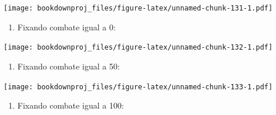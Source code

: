 \documentclass[
]{article}
\newenvironment{Shaded}{\begin{snugshade}}{\end{snugshade}}
\newcommand{\DataTypeTok}[1]{\textcolor[rgb]{0.13,0.29,0.53}{#1}}
\newcommand{\DecValTok}[1]{\textcolor[rgb]{0.00,0.00,0.81}{#1}}
\newcommand{\KeywordTok}[1]{\textcolor[rgb]{0.13,0.29,0.53}{\textbf{#1}}}
\newcommand{\NormalTok}[1]{#1}
\newcommand{\OperatorTok}[1]{\textcolor[rgb]{0.81,0.36,0.00}{\textbf{#1}}}
\newcommand{\StringTok}[1]{\textcolor[rgb]{0.31,0.60,0.02}{#1}}
\providecommand{\tightlist}{%
  \setlength{\itemsep}{0pt}\setlength{\parskip}{0pt}}
\begin{document}
\texttt{[image: bookdownproj\_files/figure-latex/unnamed-chunk-131-1.pdf]}

\begin{enumerate}
\def\labelenumi{\arabic{enumi}.}
\setcounter{enumi}{6}
\tightlist
\item
  Fixando combate igual a 0:
\end{enumerate}

\begin{Shaded}
\end{Shaded}

\texttt{[image: bookdownproj\_files/figure-latex/unnamed-chunk-132-1.pdf]}

\begin{enumerate}
\def\labelenumi{\arabic{enumi}.}
\setcounter{enumi}{7}
\tightlist
\item
  Fixando combate igual a 50:
\end{enumerate}

\begin{Shaded}
\end{Shaded}

\texttt{[image: bookdownproj\_files/figure-latex/unnamed-chunk-133-1.pdf]}

\begin{enumerate}
\def\labelenumi{\arabic{enumi}.}
\setcounter{enumi}{8}
\tightlist
\item
  Fixando combate igual a 100:
\end{enumerate}

\begin{Shaded}
\end{Shaded}
\end{document}
